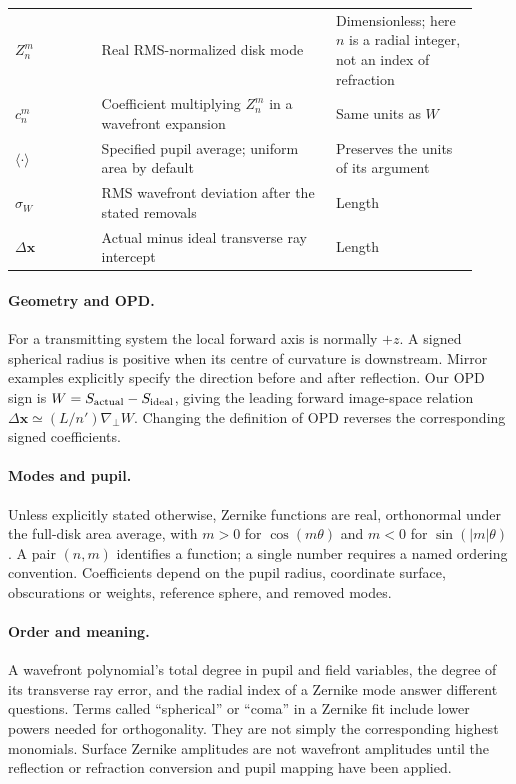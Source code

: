 \begin{longtable}{@{}>{\raggedright\arraybackslash}p{0.17\linewidth}>{\raggedright\arraybackslash}p{0.46\linewidth}>{\raggedright\arraybackslash}p{0.29\linewidth}@{}}
$Z_n^m$ & Real RMS-normalized disk mode & Dimensionless; here $n$ is a radial integer, not an index of refraction \\
$c_n^m$ & Coefficient multiplying $Z_n^m$ in a wavefront expansion & Same units as $W$ \\
$\langle\cdot\rangle$ & Specified pupil average; uniform area by default & Preserves the units of its argument \\
$\sigma_W$ & RMS wavefront deviation after the stated removals & Length \\
$\Delta\bm{x}$ & Actual minus ideal transverse ray intercept & Length \\
\bottomrule
\end{longtable}
\renewcommand{\arraystretch}{1}
\clearpage

\paragraph{Geometry and OPD.}
For a transmitting system the local forward axis is normally $+z$. A signed spherical radius is positive when its centre of curvature is downstream. Mirror examples explicitly specify the direction before and after reflection. Our OPD sign is $W=S_{\rm actual}-S_{\rm ideal}$, giving the leading forward image-space relation $\Delta\bm{x}\simeq(L/n')\nabla_\perp W$. Changing the definition of OPD reverses the corresponding signed coefficients.

\paragraph{Modes and pupil.}
Unless explicitly stated otherwise, Zernike functions are real, orthonormal under the full-disk area average, with $m>0$ for $\cos(m\theta)$ and $m<0$ for $\sin(|m|\theta)$. A pair $(n,m)$ identifies a function; a single number requires a named ordering convention. Coefficients depend on the pupil radius, coordinate surface, obscurations or weights, reference sphere, and removed modes.

\paragraph{Order and meaning.}
A wavefront polynomial's total degree in pupil and field variables, the degree of its transverse ray error, and the radial index of a Zernike mode answer different questions. Terms called ``spherical'' or ``coma'' in a Zernike fit include lower powers needed for orthogonality. They are not simply the corresponding highest monomials. Surface Zernike amplitudes are not wavefront amplitudes until the reflection or refraction conversion and pupil mapping have been applied.
